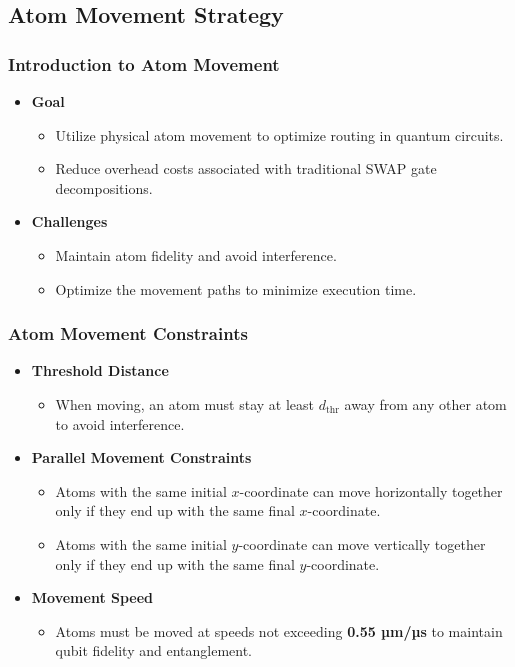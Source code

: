 \documentclass[18 pt]{beamer}
\begin{document}
\subsection{Atom Movement Strategy}
\begin{frame}
    \frametitle{Introduction to Atom Movement}
    \begin{itemize}
        \item \textbf{Goal}
        \begin{itemize}
            \item Utilize physical atom movement to optimize routing in quantum circuits.
            \item Reduce overhead costs associated with traditional SWAP gate decompositions.
        \end{itemize}
        \item \textbf{Challenges}
        \begin{itemize}
            \item Maintain atom fidelity and avoid interference.
            \item Optimize the movement paths to minimize execution time.
        \end{itemize}
    \end{itemize}
\end{frame}

\begin{frame}
    \frametitle{Atom Movement Constraints}
    \begin{itemize}
        \item \textbf{Threshold Distance}
        \begin{itemize}
            \item When moving, an atom must stay at least $d_{\text{thr}}$ away from any other atom to avoid interference.
        \end{itemize}
        \item \textbf{Parallel Movement Constraints}
        \begin{itemize}
            \item Atoms with the same initial $x$-coordinate can move horizontally together only if they end up with the same final $x$-coordinate.
            \item Atoms with the same initial $y$-coordinate can move vertically together only if they end up with the same final $y$-coordinate.
        \end{itemize}
        \item \textbf{Movement Speed}
        \begin{itemize}
            \item Atoms must be moved at speeds not exceeding \textbf{0.55 µm/µs} to maintain qubit fidelity and entanglement.
        \end{itemize}
    \end{itemize}
\end{frame}
\end{document}
